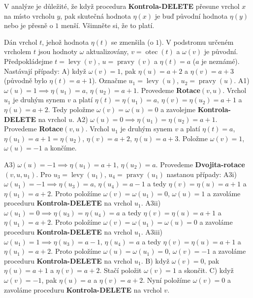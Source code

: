 \documentclass[a4paper,12pt]{article}
\DeclareMathOperator*{\otec}{otec}
\DeclareMathOperator*{\levy}{levy}
\DeclareMathOperator*{\pravy}{pravy}
\begin{document}
V analýze je důležité, že když procedura {\bf Kontrola-DELETE }
přesune vrchol $x$ na místo vrcholu $y$, pak skutečná hodnota $
\eta (x)$ 
je buď původní hodnota $\eta (y)$ nebo je přesně o $
1$ menší. Všimněte si, že to platí. 

Dán vrchol $t$, jehož hodnota $\eta (t)$ se zmenšila (o $
1$).  V 
podstromu určeném vrcholem $t$ jsou hodnoty $\omega$ aktualizovány, 
$v=\otec(t)$ a $\omega (v)$ je původní.  Předpokládejme 
$t=\levy(v)$, $u=\pravy(v)$ a $\eta (t)=a$ ($a$ je neznámé).  Nastávají 
případy:\newline 
A) když $\omega (v)=1$, pak $\eta (u)=a+2$ a $\eta (v)=a+3$ (původně 
bylo $\eta (t)=a+1$).  Označme $u_1=\levy(u)$, $u_2=\pravy(u)$.\newline 
A1) $\omega (u)=1\implies\eta (u_1)=a,\,\eta (u_2)=a+1$.  Provedeme 
{\bf Rotace$(v,u)$}.  
Vrchol $u_1$ je druhým synem $v$ a platí $\eta (t)=\eta (u_
1)=a$, 
$\eta (v)=\eta (u_2)=a+1$ a $\eta (u)=a+2$.  Tedy položme $\omega 
(v)=\omega (u)=0$ a 
zavolejme {\bf Kontrola-DELETE} na vrchol $u$.\newline 
A2) $\omega (u)=0\implies\eta (u_1)=\eta (u_2)=a+1$. Provedeme 
{\bf Rotace$(v,u)$}. Vrchol $u_1$ je druhým synem $v$ a platí 
$\eta (t)=a$, $\eta (u_1)=a+1=\eta (u_2)$, $\eta (v)=a+2$, $\eta 
(u)=a+3$. Položme 
$\omega (v)=1$, $\omega (u)=-1$ a končíme.

 

A3) $\omega (u)=-1\implies\eta (u_1)=a+1,\,\eta (u_2)=a$.  Provedeme 
{\bf Dvojita-rotace$(v,u,u_1)$}.  Pro $u_3=\levy(u_1)$, 
$u_4=\pravy(u_1)$ nastanou případy:\newline 
A3i) $\omega (u_1)=-1\implies\eta (u_3)=a,\,\eta (u_4)=a-1$ a tedy 
$\eta (v)=\eta (u)=a+1$ a $\eta (u_1)=a+2$. Proto položíme 
$\omega (v)=\omega (u_1)=0$, $\omega (u)=1$ a zavoláme proceduru {\bf Kontrola-DELETE }
na vrchol $u_1$.\newline 
A3ii) $\omega (u_1)=0\implies\eta (u_3)=\eta (u_4)=a$ a tedy 
$\eta (v)=\eta (u)=a+1$ a $\eta (u_1)=a+2$. Proto položíme 
$\omega (v)=\omega (u_1)=\omega (u)=0$ a zavoláme proceduru {\bf Kontrola-DELETE }
na vrchol $u_1$.\newline 
A3iii) $\omega (u_1)=1\implies\eta (u_3)=a-1,\,\eta (u_4)=a$ a tedy 
$\eta (v)=\eta (u)=a+1$ a $\eta (u_1)=a+2$. Proto položíme 
$\omega (u)=\omega (u_1)=0$, $\omega (v)=-1$ a zavoláme proceduru {\bf Kontrola-DELETE }
na vrchol $u_1$.\newline 
B) když $\omega (v)=0$, pak $\eta (u)=a+1$ a $\eta (v)=a+2$. 
Stačí položit $\omega (v)=1$ a skončit.\newline 
C) když $\omega (v)=-1$, pak $\eta (u)=a$ a $\eta (v)=a+2$. 
Nyní položíme $\omega (v)=0$ a 
zavoláme proceduru {\bf Kontrola-DELETE} na vrchol $v$.
\end{document}
